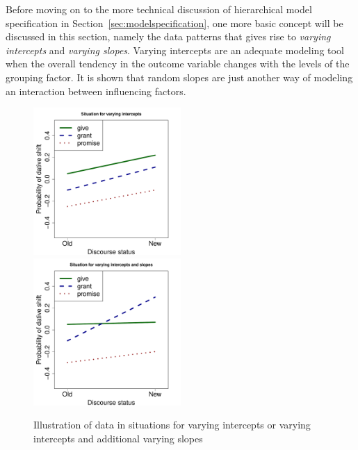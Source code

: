 \documentclass[a4paper,12pt]{article}
\begin{document}
Before moving on to the more technical discussion of hierarchical model specification in Section~\ref{sec:modelspecification}, one more basic concept will be discussed in this section, namely the data patterns that gives rise to \textit{varying intercepts} and \textit{varying slopes}. 
Varying intercepts are an adequate modeling tool when the overall tendency in the outcome variable changes with the levels of the grouping factor.
It is shown that random slopes are just another way of modeling an interaction between influencing factors.

\begin{figure}[!htpb]
  \centering
  \includegraphics[width=0.5\textwidth]{graphics/var_int}~\includegraphics[width=0.5\textwidth]{graphics/var_int_slope}
  \caption{Illustration of data in situations for varying intercepts or varying intercepts and additional varying slopes}
  \label{fig:varintlsope}
\end{figure}
\end{document}
